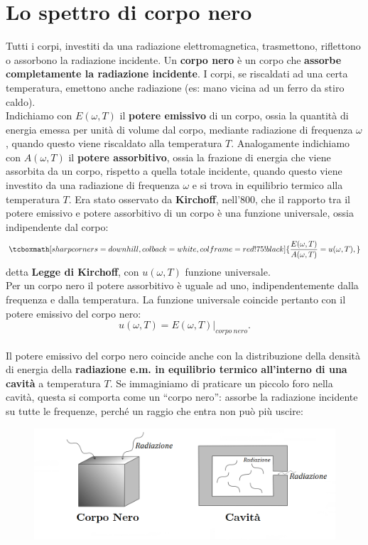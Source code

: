 \section{Lo spettro di corpo nero}
Tutti i corpi, investiti da una radiazione elettromagnetica, trasmettono, riflettono o assorbono la radiazione incidente. Un \textbf{corpo nero} è un corpo che \textbf{assorbe completamente la radiazione incidente}. I corpi, se riscaldati ad una certa temperatura, emettono anche radiazione (es: mano vicina ad un ferro da stiro caldo).\\

Indichiamo con $E(\omega , T) $ il \textbf{potere emissivo} di un corpo, ossia la quantità di energia emessa per unità di volume dal corpo, mediante radiazione di frequenza $\omega$, quando questo viene riscaldato alla temperatura $T$. Analogamente indichiamo con $A(\omega , T )$ il \textbf{potere assorbitivo}, ossia la frazione di energia che viene assorbita da un corpo, rispetto a quella totale incidente, quando questo viene investito da una radiazione di frequenza $\omega$ e si trova in equilibrio termico alla temperatura  $T$.
Era stato osservato da \textbf{Kirchoff}, nell'800, che il rapporto tra il potere emissivo e potere assorbitivo di un corpo è una funzione universale, ossia indipendente dal corpo:
	\begin{equation}
		\tcboxmath[sharp corners=downhill ,colback=white,colframe=red!75!black]{
			\frac{E(\omega ,T)}{A(\omega ,T)}= u(\omega , T),
		}
	\end{equation}
detta \textbf{Legge di Kirchoff}, con $u(\omega , T)$ funzione universale.\\

Per un corpo nero il potere assorbitivo è uguale ad uno, indipendentemente dalla frequenza e dalla temperatura. La funzione universale coincide pertanto con il potere emissivo del corpo nero:
	\begin{equation}
		u(\omega, T)= E(\omega , T)|_{corpo\ nero}.
	\end{equation}\\
	
Il potere emissivo del corpo nero coincide anche con la distribuzione della densità di energia della \textbf{radiazione e.m. in equilibrio termico all'interno di una cavità} a temperatura $T$. Se immaginiamo di praticare un piccolo foro nella cavità, questa si comporta come un ``corpo nero'': assorbe la radiazione incidente su tutte le frequenze, perché un raggio che entra non può più uscire:\\
	\begin{figure}[!htbp]
		\includegraphics[width=\textwidth]{immagini/cap_1/fig_1_1.png}
	\end{figure}
	
